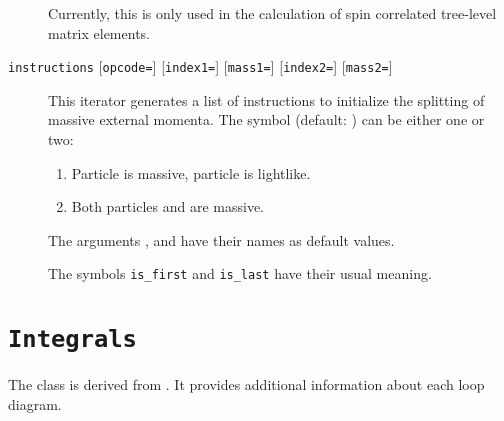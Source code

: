 \documentclass[11pt,a4paper]{refrep}
\begin{document}
\begin{description}
   Currently, this is only used in the calculation of spin correlated
   tree-level matrix elements.
\item[\texttt{instructions}
   {[\texttt{opcode=}\synt{opcode}]}
   {[\texttt{index1=}\synt{index$_1$}]}
   {[\texttt{mass1=}\synt{mass$_1$}]}
   {[\texttt{index2=}\synt{index$_2$}]}
   {[\texttt{mass2=}\synt{mass$_2$}]}]
   This iterator generates a list of
   instructions to initialize the splitting of massive external momenta.
   The symbol  (default: ) can be either one or two:
   \begin{enumerate}
   \item Particle  is massive, particle 
       is lightlike.
   \item Both particles  and  are massive.
   \end{enumerate}
   The arguments ,  and 
   have their names as default values.

   The symbols \texttt{is\_first} and \texttt{is\_last} have their
   usual meaning.
\end{description}

\section{\texttt{Integrals}}
The class  is derived from . It provides
additional information about each loop diagram.

\end{document}
